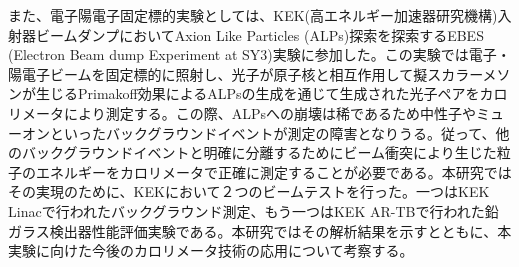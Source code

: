   また、電子陽電子固定標的実験としては、KEK(高エネルギー加速器研究機構)入射器ビームダンプにおいてAxion Like Particles (ALPs)探索を探索するEBES (Electron Beam dump Experiment at SY3)実験に参加した。この実験では電子・陽電子ビームを固定標的に照射し、光子が原子核と相互作用して擬スカラーメソンが生じるPrimakoff効果によるALPsの生成を通じて生成された光子ペアをカロリメータにより測定する。この際、ALPsへの崩壊は稀であるため中性子やミューオンといったバックグラウンドイベントが測定の障害となりうる。従って、他のバックグラウンドイベントと明確に分離するためにビーム衝突により生じた粒子のエネルギーをカロリメータで正確に測定することが必要である。本研究ではその実現のために、KEKにおいて２つのビームテストを行った。一つはKEK Linacで行われたバックグラウンド測定、もう一つはKEK AR-TBで行われた鉛ガラス検出器性能評価実験である。本研究ではその解析結果を示すとともに、本実験に向けた今後のカロリメータ技術の応用について考察する。
 



